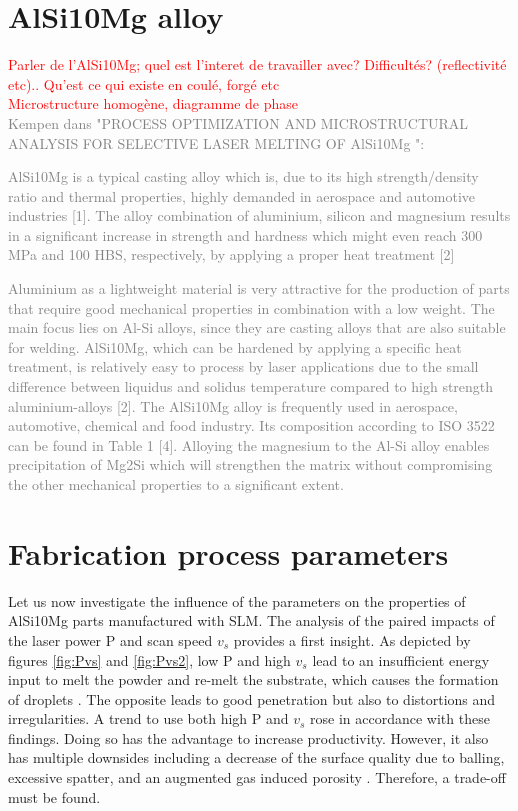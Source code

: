 \section{AlSi10Mg alloy}
\textcolor{red}{Parler de l'AlSi10Mg; quel est l'interet de travailler avec? Difficultés? (reflectivité etc).. Qu'est ce qui existe en coulé, forgé etc}\\
\textcolor{red}{Microstructure homogène, diagramme de phase}\\

\textcolor{gray}{Kempen dans "PROCESS OPTIMIZATION AND MICROSTRUCTURAL ANALYSIS FOR SELECTIVE LASER
MELTING OF AlSi10Mg ":}

\textcolor{gray}{AlSi10Mg is a typical casting alloy which is, due to its high strength/density ratio and thermal
properties, highly demanded in aerospace and automotive industries [1]. The alloy combination of aluminium,
silicon and magnesium results in a significant increase in strength and hardness which might even reach 300
MPa and 100 HBS, respectively, by applying a proper heat treatment [2]}

\textcolor{gray}{Aluminium as a lightweight material is very attractive for the production of parts that require good
mechanical properties in combination with a low weight. The main focus lies on Al-Si alloys, since they are
casting alloys that are also suitable for welding. AlSi10Mg, which can be hardened by applying a specific heat
treatment, is relatively easy to process by laser applications due to the small difference between liquidus and
solidus temperature compared to high strength aluminium-alloys [2]. The AlSi10Mg alloy is frequently used in
aerospace, automotive, chemical and food industry. Its composition according to ISO 3522 can be found in
Table 1 [4]. Alloying the magnesium to the Al-Si alloy enables precipitation of Mg2Si which will strengthen the
matrix without compromising the other mechanical properties to a significant extent.}
\section{Fabrication process parameters}
\label{pp}
Let us now investigate the influence of the parameters on the properties of AlSi10Mg parts manufactured with SLM. The analysis of the paired impacts of the laser power P and scan speed $v_s$ provides a first insight. As depicted by figures \ref{fig:Pvs} and \ref{fig:Pvs2}, low P and high $v_s$ lead to an insufficient energy input to melt the powder and re-melt the substrate, which causes the formation of droplets \parencite{Kempen110817} . The opposite leads to good penetration but also to distortions and irregularities.   A trend to use both high P and $v_s$ rose in accordance with these findings. Doing so has the advantage to increase productivity. However, it also has multiple downsides including a decrease of the surface quality due to balling, excessive spatter, and an augmented gas induced porosity \parencite{Mertens170406}. Therefore, a trade-off must be found. \\

